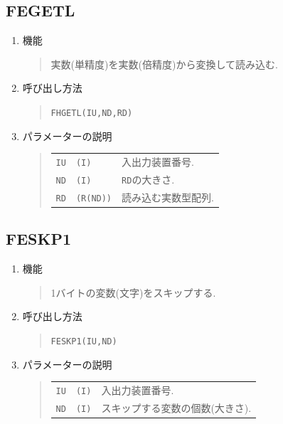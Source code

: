 \subsection{FEGETL}
\begin{enumerate}
  \item 機能 
  \begin{quote}
   実数(単精度)を実数(倍精度)から変換して読み込む.
  \end{quote}
  \item 呼び出し方法 
  \begin{quote}
    {\tt FHGETL(IU,ND,RD)}
  \end{quote}
  \item パラメーターの説明 
  \begin{quote}
    \begin{tabular}{llp{10cm}}
      {\tt IU}   & {\tt (I)} & 入出力装置番号. \\
      {\tt ND}   & {\tt (I)} & {\tt RD}の大きさ.\\
      {\tt RD}   & {\tt (R(ND))} & 読み込む実数型配列.
    \end{tabular}
  \end{quote}
\end{enumerate}

\subsection{FESKP1}
\begin{enumerate}
  \item 機能 
  \begin{quote}
   1バイトの変数(文字)をスキップする.
  \end{quote}
  \item 呼び出し方法 
  \begin{quote}
   {\tt FESKP1(IU,ND)}
  \end{quote}
  \item パラメーターの説明 
  \begin{quote}
    \begin{tabular}{llp{10cm}}
      {\tt IU}   & {\tt (I)} & 入出力装置番号. \\
      {\tt ND}   & {\tt (I)} & スキップする変数の個数(大きさ).
    \end{tabular}
  \end{quote}
\end{enumerate}

